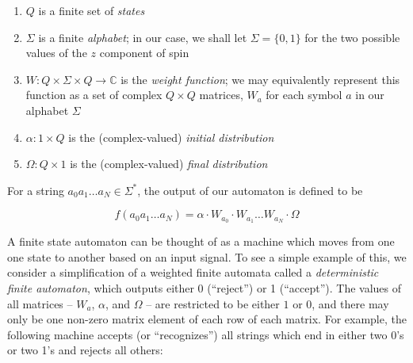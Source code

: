 \documentclass{amsbook}
\theoremstyle{plain}
\theoremstyle{definition}
\theoremstyle{remark}
\newcommand{\eqn}[2][]{\begin{equation}\label{#1}#2\end{equation}}
\begin{document}
\begin{enumerate}
\item $Q$ is a finite set of \textit{states}
\item $\Sigma$ is a finite \textit{alphabet}; in our case, we shall let $\Sigma=\{0,1\}$ for the two possible values of the $z$ component of spin
\item $W:Q\times\Sigma\times Q\to \mathbb{C}$ is the \textit{weight function};  we may equivalently represent this function as a set of complex $Q\times Q$ matrices, $W_a$ for each symbol $a$ in our alphabet $\Sigma$
\item $\alpha:1\times Q$ is the (complex-valued) \textit{initial distribution}
\item $\Omega:Q\times 1$ is the (complex-valued) \textit{final distribution}
\end{enumerate}

For a string $a_0a_1\dots a_N\in\Sigma^*$, the output of our automaton is defined to be

\eqn[wfa-compute-eqn]{f(a_0a_1\dots a_N) = \alpha \cdot W_{a_0} \cdot W_{a_1} \dots W_{a_N} \cdot \Omega}

A finite state automaton can be thought of as a machine which moves from one one state to another based on an input signal.  To see a simple example of this, we consider a simplification of a weighted finite automata called a \textit{deterministic finite automaton}, which outputs either 0 (``reject'') or 1 (``accept'').  The values of all matrices -- $W_a$, $\alpha$, and $\Omega$ -- are restricted to be either $1$ or $0$, and there may only be one non-zero matrix element of each row of each matrix.  For example, the following machine accepts (or ``recognizes'') all strings which end in either two 0's or two 1's and rejects all others:
\end{document}
